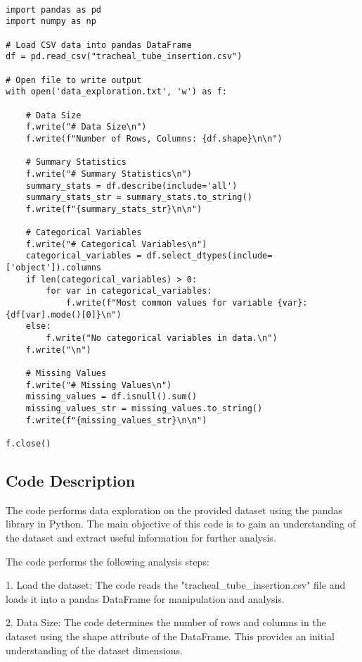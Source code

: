\documentclass[11pt]{article}
\begin{document}
\begin{verbatim}

import pandas as pd
import numpy as np

# Load CSV data into pandas DataFrame
df = pd.read_csv("tracheal_tube_insertion.csv")

# Open file to write output
with open('data_exploration.txt', 'w') as f:  
   
    # Data Size
    f.write("# Data Size\n")
    f.write(f"Number of Rows, Columns: {df.shape}\n\n")

    # Summary Statistics
    f.write("# Summary Statistics\n")
    summary_stats = df.describe(include='all')
    summary_stats_str = summary_stats.to_string() 
    f.write(f"{summary_stats_str}\n\n")
     
    # Categorical Variables
    f.write("# Categorical Variables\n")
    categorical_variables = df.select_dtypes(include=['object']).columns
    if len(categorical_variables) > 0:
        for var in categorical_variables:
            f.write(f"Most common values for variable {var}: {df[var].mode()[0]}\n")
    else:
        f.write("No categorical variables in data.\n")
    f.write("\n")

    # Missing Values
    f.write("# Missing Values\n")
    missing_values = df.isnull().sum()
    missing_values_str = missing_values.to_string() 
    f.write(f"{missing_values_str}\n\n")
    
f.close()

\end{verbatim}

\subsection{Code Description}

The code performs data exploration on the provided dataset using the pandas library in Python. 
The main objective of this code is to gain an understanding of the dataset and extract useful information for further analysis. 

The code performs the following analysis steps:

1. Load the dataset: The code reads the "tracheal\_tube\_insertion.csv" file and loads it into a pandas DataFrame for manipulation and analysis.

2. Data Size: The code determines the number of rows and columns in the dataset using the shape attribute of the DataFrame. This provides an initial understanding of the dataset dimensions.
\end{document}
